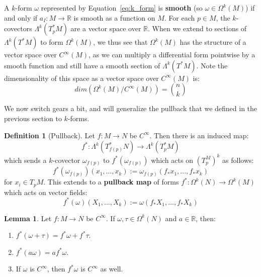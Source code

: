 \documentclass[11pt, oneside]{article}   	%
\theoremstyle{definition}
\newtheorem{definition}{Definition}[section]
\newtheorem{lemma}[theorem]{Lemma}
\begin{document}
A $k$-form $\omega$ represented by Equation~\ref{eq:k_form} is \textbf{smooth} (so $\omega\in\Omega^k(M)$) if and only if 
$a_I : M\rightarrow\mathbb R$ is smooth as a function on $M$. For each $p\in M$, the $k$-covectors $\Lambda^k(T_p^* M)$ 
are a vector space over $\mathbb R$. When we extend to sections of $\Lambda^k(T^* M)$ to form $\Omega^k(M)$, we 
thus see that $\Omega^k(M)$ has the structure of a vector space over $C^\infty(M)$, as we can multiply a differential 
form pointwise by a smooth function and still have a smooth section of $\Lambda^k(T^* M)$. Note the dimensionality of 
this space as a vector space over $C^\infty(M)$ is:
\begin{equation}
	dim(\Omega^k(M) / C^\infty(M)) = {n\choose k}
\end{equation}

We now switch gears a bit, and will generalize the pullback that we defined in the previous section to $k$-forms. 
\begin{definition}[Pullback]
	Let $f : M\rightarrow N$ be $C^\infty$. Then there is an induced map:
	\begin{equation}
		f^* : \Lambda^k\left(T_{f(p)}^* N\right)\rightarrow\Lambda^k\left(T_p^* M\right)
	\end{equation}
	which sends a $k$-covector $\omega_{f(p)}$ to $f^*(\omega_{f(p)})$ which acts on $\left(T_p^M\right)^k$ as follows:
	\begin{equation}
		f^*(\omega_{f(p)})(x_1, ..., x_k) := \omega_{f(p)}(f_* x_1, ..., f_* x_k)
	\end{equation}
	for $x_i\in T_p M$. This extends to a \textbf{pullback map} of forms $f^* : \Omega^k(N)\rightarrow\Omega^k(M)$ which 
	acts on vector fields:
	\begin{equation}
		f^*(\omega)(X_1, ..., X_k) := \omega(f_* X_1, ..., f_* X_k)
	\end{equation}
\end{definition}
\begin{lemma}
	Let $f : M\rightarrow N$ be $C^\infty$. If $\omega, \tau\in\Omega^k(N)$ and $a\in\mathbb R$, then:
	\begin{enumerate}
		\item $f^*(\omega + \tau) = f^*\omega + f^*\tau$. 
		\item $f^*(a\omega) = af^*\omega$. 
		\item If $\omega$ is $C^\infty$, then $f^*\omega$ is $C^\infty$ as well. 
	\end{enumerate}
\end{lemma}
\end{document}
